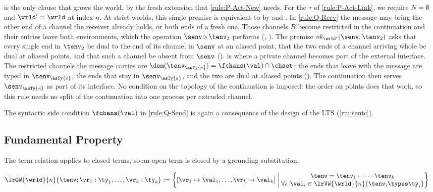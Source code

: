  is the only clause that grows the world, by the fresh
extension that \ref{rule:P-Act-New} needs.
For the $\tau$ of \ref{rule:P-Act-Link}, we require $N = \emptyset$
and $\wrld' = \wrld$ at index $n$.
At strict worlds, this single premise is equivalent to 
by  and .
In \ref{rule:Q-Recv} the message may bring the other end of a channel
the receiver already holds, or both ends of a fresh one. Those channels
$B$ become restricted in the continuation and their entries leave both
environments, which the operation $\senv \mathbin{\triangleright} \tenv_2$
performs (, ). The premise
$\mathit{ok}_{\wrld'}(\senv, \tenv_2)$ asks that every single end in
$\tenv_2$ be dual to the end of its channel in $\senv$ at an aliased
point, that the two ends of a channel arriving whole be dual at aliased
points, and that such a channel be absent from $\senv$
().
 is where a private channel becomes part of the
external interface. The restricted channels the message carries are
$\dom(\tenv_{\asTy{e}}) = \fchans(\val) \cap \chset$; the ends that
leave with the message are typed in $\tenv_{\asTy{e}}$, the ends that
stay in $\senv_{\asTy{e}}$, and the two are dual at aliased points
(). The continuation then serves
$\senv_{\asTy{e}}$ as part of its interface. No condition on the
topology of the continuation is imposed: the order on points does that
work, so this rule needs no split of the continuation into one process
per extruded channel.

The syntactic side condition $\fchans(\val)$ in \ref{rule:Q-Send} is
again a consequence of the design of the LTS (\cref{rm:sentc}).

\subsection{Fundamental Property}
\label{sec:fundamental}

The term relation applies to closed terms, so an open term is closed by
a grounding substitution.

\begin{definition}
\label{def:grounding}
  \[
    \lrGW{\wrld}{n}{\tenv ; \vr_1 : \ty_1, \dots, \vr_k : \ty_k} :=
      \left\{
        [\vr_1 \mapsto \val_1,\dots,\vr_k \mapsto \val_k] \;\middle|\;
          \begin{matrix}
          \tenv = \tenv_1 \cdot {} \dots \cdot \tenv_k
            \\
          \forall i.\,
            \val_i \in \lrVW{\wrld}{n}{\tenv_i \types \ty_i}
          \end{matrix}
      \right\}
  \]
\end{definition}

